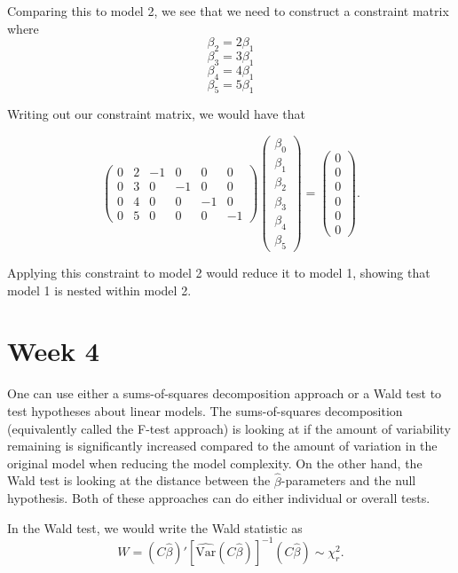 \documentclass[
  letterpaper,
  DIV=11,
  numbers=noendperiod]{scrreport}
\begin{document}
Comparing this to model 2, we see that we need to construct a constraint
matrix where \[\beta_2 = 2 \beta_1\] \[\beta_3 = 3 \beta_1\]
\[\beta_4 = 4 \beta_1\] \[\beta_5 = 5 \beta_1\]

Writing out our constraint matrix, we would have that

\[\begin{pmatrix}
0 & 2 & -1 & 0 & 0 & 0 \\ 
0 & 3 & 0 & -1 & 0 & 0 \\ 
0 & 4 & 0 & 0 & -1 & 0 \\ 
0 & 5 & 0 & 0 & 0 & -1
\end{pmatrix}
\begin{pmatrix}
\beta_0 \\ \beta_1 \\ \beta_2 \\ \beta_3 \\ \beta_4 \\ \beta_5
\end{pmatrix} = 
\begin{pmatrix}
0 \\ 0 \\ 0 \\ 0 \\ 0 \\ 0 
\end{pmatrix}.\]

Applying this constraint to model 2 would reduce it to model 1, showing
that model 1 is nested within model 2.


\hypertarget{week-4}{%
\chapter{Week 4}\label{week-4}}

One can use either a sums-of-squares decomposition approach or a Wald
test to test hypotheses about linear models. The sums-of-squares
decomposition (equivalently called the F-test approach) is looking at if
the amount of variability remaining is significantly increased compared
to the amount of variation in the original model when reducing the model
complexity. On the other hand, the Wald test is looking at the distance
between the \(\hat \beta\)-parameters and the null hypothesis. Both of
these approaches can do either individual or overall tests.

In the Wald test, we would write the Wald statistic as
\[W = (C\hat\beta)'[\widehat{\text{Var}}(C\hat\beta)]^{-1} (C\hat\beta) \sim \chi_r^2.\]
\end{document}
